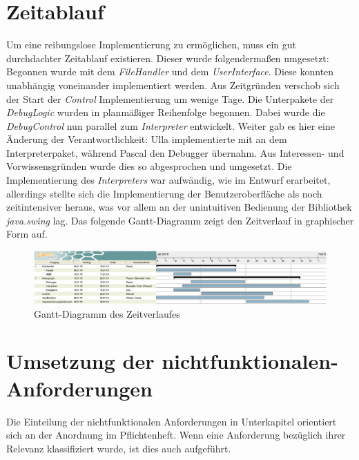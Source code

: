 \documentclass[parskip=full]{scrartcl}
\begin{document}
\section{Zeitablauf}
Um eine reibungslose Implementierung zu ermöglichen, muss ein gut durchdachter Zeitablauf existieren.
Dieser wurde folgendermaßen umgesetzt:\\
Begonnen wurde mit dem \textit{FileHandler} und dem \textit{UserInterface}. Diese konnten unabhängig voneinander implementiert werden.
Aus Zeitgründen verschob sich der Start der \textit{Control} Implementierung um wenige Tage.
Die Unterpakete der \textit{DebugLogic} wurden in planmäßiger Reihenfolge begonnen. Dabei wurde die \textit{DebugControl} nun parallel zum \textit{Interpreter} entwickelt.
Weiter gab es hier eine Änderung der Verantwortlichkeit: Ulla implementierte mit an dem Interpreterpaket, während Pascal den Debugger übernahm.
Aus Interessen- und Vorwissensgründen wurde dies so abgesprochen und umgesetzt.
Die Implementierung des \textit{Interpreters} war aufwändig, wie im Entwurf erarbeitet, allerdings stellte sich die Implementierung der Benutzeroberfläche als noch zeitintensiver heraus, was vor allem an der unintuitiven Bedienung der Bibliothek \textit{java.swing} lag.
Das folgende Gantt-Diagramm zeigt den Zeitverlauf in graphischer Form auf.
\begin{figure}[!h]
\centering
\includegraphics[width=1.0\textwidth]{ganntDiagramm_neu_crop.pdf}
\caption{Gantt-Diagramm des Zeitverlaufes}
\end{figure}

\section{Umsetzung der nichtfunktionalen-Anforderungen}

Die Einteilung der nichtfunktionalen Anforderungen in Unterkapitel orientiert sich an der Anordnung im Pflichtenheft. Wenn eine Anforderung bezüglich ihrer Relevanz klassifiziert wurde, ist dies auch aufgeführt.
\end{document}
